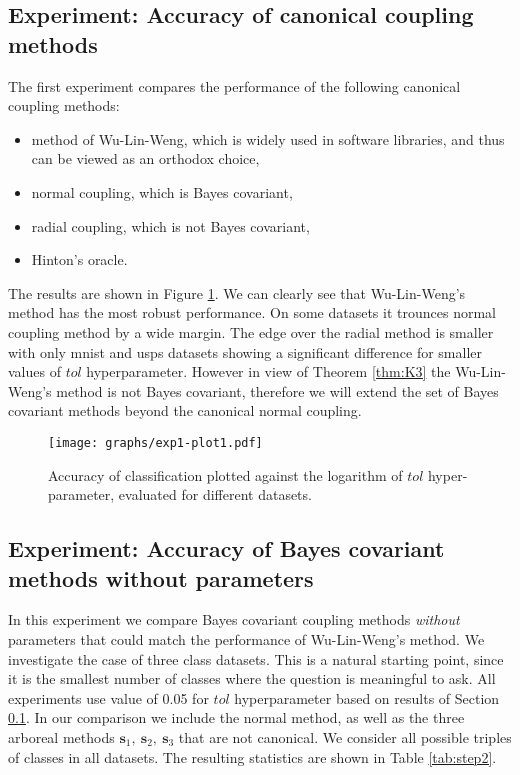 \subsection{Experiment: Accuracy of canonical coupling methods} \label{sec:exp1}

The first experiment compares the performance of the following canonical coupling methods:
\begin{itemize}
\item method of Wu-Lin-Weng, which is widely used in software libraries, and thus can be viewed as an orthodox choice,
\item normal coupling, which is Bayes covariant,
\item radial coupling, which is not Bayes covariant,
\item Hinton's oracle.
\end{itemize}

% 
The results are shown in Figure \ref{fig:exp1-plot1}. We can clearly see that Wu-Lin-Weng's method has the most robust performance. On some datasets it trounces normal coupling method by a wide margin. The edge over the radial method is smaller with only mnist and usps datasets showing a significant difference for smaller values of $tol$ hyperparameter.  However in view of Theorem \ref{thm:K3} the Wu-Lin-Weng's method is not Bayes covariant, therefore we will extend the set of Bayes covariant methods beyond the canonical normal coupling.

\begin{figure}
	\texttt{[image: graphs/exp1-plot1.pdf]}
	\caption{Accuracy of classification plotted against the logarithm of $tol$ hyper-parameter, evaluated for different datasets.}
	\label{fig:exp1-plot1}
\end{figure}

\subsection{Experiment: Accuracy of Bayes covariant methods without parameters}
 \label{sec:exp2}


In this experiment we compare  Bayes covariant coupling methods \emph{without} parameters that could match the performance of Wu-Lin-Weng's method. We investigate  the case of three class datasets. This is a natural starting point, since it is the smallest number of classes where the question is meaningful to ask. All experiments use value of 0.05 for $tol$ hyperparameter based on results of Section \ref{sec:exp1}.  In our comparison we include the normal method, as well as the three arboreal methods $ \boldsymbol{s}_1,~ \boldsymbol{s}_2,~ \boldsymbol{s}_3$ that are not canonical. We consider all possible triples of classes in all datasets. The resulting statistics are shown in Table \ref{tab:step2}. 

